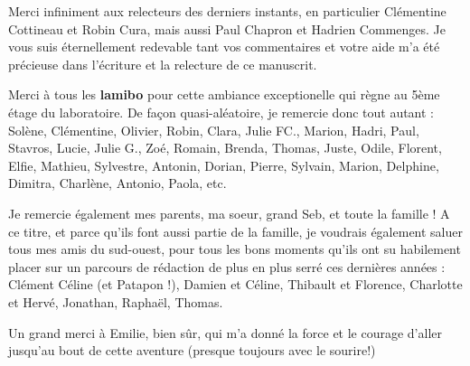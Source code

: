 \medskip
Merci infiniment aux relecteurs des derniers instants, en particulier Clémentine Cottineau et Robin Cura, mais aussi Paul Chapron et Hadrien Commenges. Je vous suis éternellement redevable tant vos commentaires et votre aide m’a été précieuse dans l’écriture et la relecture de ce manuscrit.

\medskip
Merci à tous les \textbf{lamibo} pour cette ambiance exceptionelle qui règne au 5ème étage du laboratoire. De façon quasi-aléatoire, je remercie donc tout autant : Solène, Clémentine, Olivier, Robin, Clara, Julie FC., Marion, Hadri, Paul, Stavros, Lucie, Julie G., Zoé, Romain, Brenda, Thomas, Juste, Odile, Florent, Elfie, Mathieu, Sylvestre, Antonin, Dorian, Pierre, Sylvain, Marion, Delphine, Dimitra, Charlène,  Antonio, Paola, etc.

\medskip
Je remercie également mes parents, ma soeur, grand Seb, et toute la famille ! A ce titre, et parce qu’ils font aussi partie de la famille, je voudrais également saluer tous mes amis du sud-ouest, pour tous les bons moments qu’ils ont su habilement placer sur un parcours de rédaction de plus en plus serré ces dernières années : Clément Céline (et Patapon !), Damien et Céline, Thibault et Florence, Charlotte et Hervé, Jonathan, Raphaël, Thomas. 

\medskip
Un grand merci à Emilie, bien sûr, qui m'a donné la force et le courage d’aller jusqu’au bout de cette aventure (presque toujours avec le sourire!) 
